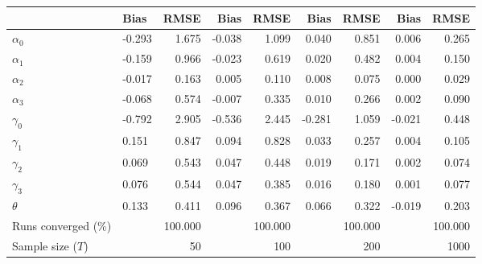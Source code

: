 
\begin{tabular}[t]{llrrrrrrr}
\toprule
  & Bias & RMSE & Bias & RMSE & Bias & RMSE & Bias & RMSE\\
\midrule
$\alpha_{0}$ & -0.293 & 1.675 & -0.038 & 1.099 & 0.040 & 0.851 & 0.006 & 0.265\\
$\alpha_{1}$ & -0.159 & 0.966 & -0.023 & 0.619 & 0.020 & 0.482 & 0.004 & 0.150\\
$\alpha_{2}$ & -0.017 & 0.163 & 0.005 & 0.110 & 0.008 & 0.075 & 0.000 & 0.029\\
$\alpha_{3}$ & -0.068 & 0.574 & -0.007 & 0.335 & 0.010 & 0.266 & 0.002 & 0.090\\
$\gamma_{0}$ & -0.792 & 2.905 & -0.536 & 2.445 & -0.281 & 1.059 & -0.021 & 0.448\\
$\gamma_{1}$ & 0.151 & 0.847 & 0.094 & 0.828 & 0.033 & 0.257 & 0.004 & 0.105\\
$\gamma_{2}$ & 0.069 & 0.543 & 0.047 & 0.448 & 0.019 & 0.171 & 0.002 & 0.074\\
$\gamma_{3}$ & 0.076 & 0.544 & 0.047 & 0.385 & 0.016 & 0.180 & 0.001 & 0.077\\
$\theta$ & 0.133 & 0.411 & 0.096 & 0.367 & 0.066 & 0.322 & -0.019 & 0.203\\
Runs converged (\%) &  & 100.000 &  & 100.000 &  & 100.000 &  & 100.000\\
Sample size ($T$) &  & 50 &  & 100 &  & 200 &  & 1000\\
\bottomrule
\end{tabular}
